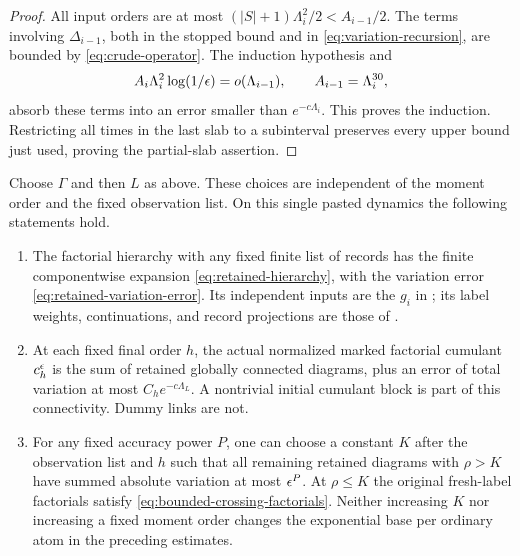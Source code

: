 \begin{proof}
All input orders are at most $(|S|+1)\Lambda_i^2/2<A_{i-1}/2$.
The terms involving $\Delta_{i-1}$, both in the stopped bound and in
\eqref{eq:variation-recursion}, are bounded by
\eqref{eq:crude-operator}.  The induction hypothesis and
\[
 A_i\Lambda_i^2\log(1/\epsilon)=o(\Lambda_{i-1}),
 \qquad A_{i-1}=\Lambda_i^{30},
\]
absorb these terms into an error smaller than
$e^{-c\Lambda_i}$.  This proves the induction.  Restricting all times
in the last slab to a subinterval preserves every upper bound just
used, proving the partial-slab assertion.
\end{proof}

\begin{theorem}\label{thm:marked-expansion}
Choose $\Gamma$ and then $L$ as above.  These choices are independent of
the moment order and the fixed observation list.  On this single pasted
dynamics the following statements hold.
\begin{enumerate}[label=(\roman*)]
 \item The factorial hierarchy with any fixed finite list of records
 has the finite componentwise expansion
 \eqref{eq:retained-hierarchy}, with the variation error
 \eqref{eq:retained-variation-error}.  Its independent inputs are the
 $g_i$ in ; its label weights, continuations, and
 record projections are those of
 .
 \item At each fixed final order $h$, the actual normalized marked
 factorial cumulant $c_h^\epsilon$ is the sum of retained globally connected
 diagrams, plus an error of total variation at most
 $C_h e^{-c\Lambda_L}$.  A nontrivial initial cumulant block is part of
 this connectivity.  Dummy links are not.
 \item For any fixed accuracy power $P$, one can choose a constant
 $K$ after the observation list and $h$ such that all remaining
 retained diagrams with $\rho>K$ have summed absolute variation at
 most $\epsilon^P$.  At $\rho\le K$ the original fresh-label factorials
 satisfy \eqref{eq:bounded-crossing-factorials}.  Neither increasing
 $K$ nor increasing a fixed moment order changes the exponential base
 per ordinary atom in the preceding estimates.
\end{enumerate}
\end{theorem}


